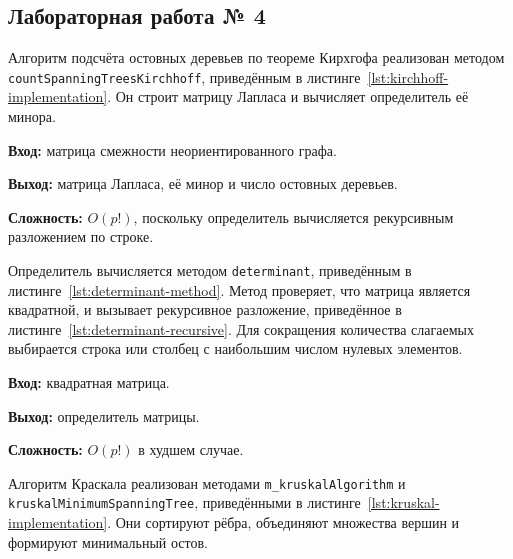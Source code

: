
\subsection{Лабораторная работа № 4}

Алгоритм подсчёта остовных деревьев по теореме Кирхгофа реализован методом \texttt{countSpanningTreesKirchhoff}, приведённым в листинге~\ref{lst:kirchhoff-implementation}. Он строит матрицу Лапласа и вычисляет определитель её минора.

\textbf{Вход:} матрица смежности неориентированного графа.

\textbf{Выход:} матрица Лапласа, её минор и число остовных деревьев.

\textbf{Сложность:} $O(p!)$, поскольку определитель вычисляется рекурсивным разложением по строке.


Определитель вычисляется методом \texttt{determinant}, приведённым в листинге~\ref{lst:determinant-method}. Метод проверяет, что матрица является квадратной, и вызывает рекурсивное разложение, приведённое в листинге~\ref{lst:determinant-recursive}. Для сокращения количества слагаемых выбирается строка или столбец с наибольшим числом нулевых элементов.

\textbf{Вход:} квадратная матрица.

\textbf{Выход:} определитель матрицы.

\textbf{Сложность:} $O(p!)$ в худшем случае.



Алгоритм Краскала реализован методами \texttt{m\_kruskalAlgorithm} и \texttt{kruskalMinimumSpanningTree}, приведёнными в листинге~\ref{lst:kruskal-implementation}. Они сортируют рёбра, объединяют множества вершин и формируют минимальный остов.

